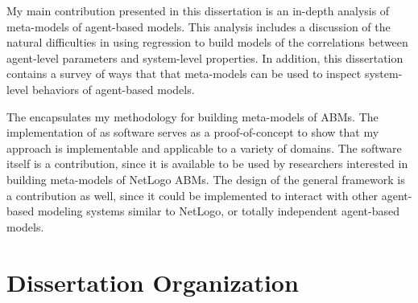 My main contribution presented in this dissertation is an in-depth analysis of meta-models of agent-based models.
This analysis includes a discussion of the natural difficulties in using regression to build models of the correlations between agent-level parameters and system-level properties. 
In addition, this dissertation contains a survey of ways that that meta-models can be used to inspect system-level behaviors of agent-based models.

The \framework encapsulates my methodology for building meta-models of ABMs.
The implementation of \fw as software serves as a proof-of-concept to show that my approach is implementable and applicable to a variety of domains.
The software itself is a contribution, since it is available to be used by researchers interested in building meta-models of NetLogo ABMs.
The design of the general framework is a contribution as well, since it could be implemented to interact with other agent-based modeling systems similar to NetLogo, or totally independent agent-based models.


\section{Dissertation Organization}

